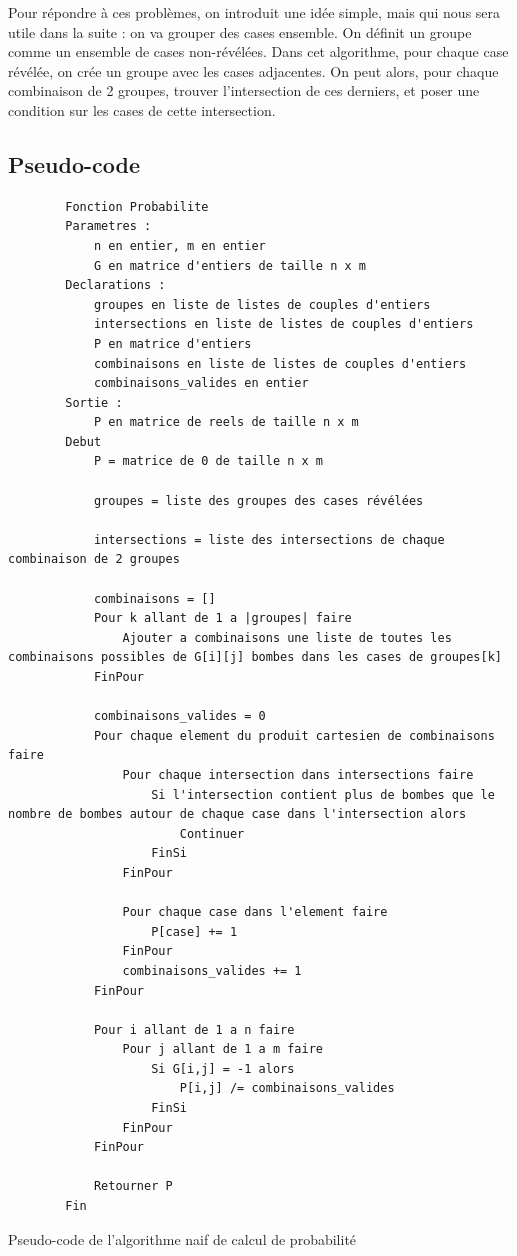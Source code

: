 Pour répondre à ces problèmes, on introduit une idée simple, mais qui nous sera utile dans la suite : on va grouper des cases ensemble.
\newline
On définit un groupe comme un ensemble de cases non-révélées. 
\newline
Dans cet algorithme, pour chaque case révélée, on crée un groupe avec les cases adjacentes.
\newline
On peut alors, pour chaque combinaison de 2 groupes, trouver l'intersection de ces derniers, et poser une condition sur les cases de cette intersection.

\subsection{Pseudo-code}

\begin{longlisting}
    \begin{verbatim}
        Fonction Probabilite
        Parametres :
            n en entier, m en entier
            G en matrice d'entiers de taille n x m
        Declarations :
            groupes en liste de listes de couples d'entiers
            intersections en liste de listes de couples d'entiers
            P en matrice d'entiers
            combinaisons en liste de listes de couples d'entiers
            combinaisons_valides en entier
        Sortie :
            P en matrice de reels de taille n x m
        Debut
            P = matrice de 0 de taille n x m
    
            groupes = liste des groupes des cases révélées

            intersections = liste des intersections de chaque combinaison de 2 groupes

            combinaisons = []
            Pour k allant de 1 a |groupes| faire
                Ajouter a combinaisons une liste de toutes les combinaisons possibles de G[i][j] bombes dans les cases de groupes[k]
            FinPour

            combinaisons_valides = 0
            Pour chaque element du produit cartesien de combinaisons faire
                Pour chaque intersection dans intersections faire
                    Si l'intersection contient plus de bombes que le nombre de bombes autour de chaque case dans l'intersection alors
                        Continuer
                    FinSi
                FinPour

                Pour chaque case dans l'element faire
                    P[case] += 1
                FinPour
                combinaisons_valides += 1
            FinPour

            Pour i allant de 1 a n faire
                Pour j allant de 1 a m faire
                    Si G[i,j] = -1 alors
                        P[i,j] /= combinaisons_valides
                    FinSi
                FinPour
            FinPour

            Retourner P
        Fin
    \end{verbatim}
    \caption{Pseudo-code de l'algorithme naif de calcul de probabilité}
    \label{listing:algo-naif}
\end{longlisting}

